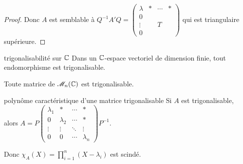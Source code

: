 \begin{proof}
    Donc $A$ est semblable à $Q^{-1} A' Q = \begin{pmatrix}
        \lambda & * & \cdots & * \\
        0 & & & \\
        \vdots & & T & \\
        0 & & &
    \end{pmatrix}$ qui est triangulaire supérieure.
\end{proof}

\begin{corollaire}{trigonalisabilité sur $\mathbb{C}$}{}
    Dans un $\mathbb{C}$-espace vectoriel de dimension finie, tout endomorphisme est trigonalisable.

    Toute matrice de $\mathscr M_n(\mathbb{C})$ est trigonalisable.
\end{corollaire}


\begin{corollaire}{polynôme caractéristique d'une matrice trigonalisable}{}
    Si $A$ est trigonalisable, alors $A = P \begin{pmatrix}
        \lambda_1 & * & \cdots & * \\
        0 & \lambda_2 & \cdots & * \\
        \vdots & \vdots & \ddots & \vdots \\
        0 & 0 & \cdots & \lambda_n
    \end{pmatrix} P^{-1}$.

    Donc $\displaystyle \chi_A(X) = \prod_{i = 1 }^{ n } (X - \lambda_i)$ est scindé.
\end{corollaire}


